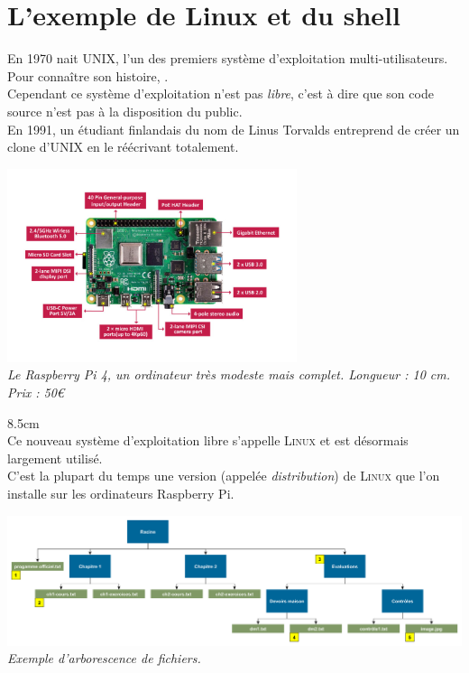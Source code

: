 \documentclass[a4paper,12pt,french]{book}
\begin{document}
	\section*{L'exemple de Linux et du shell}

	\double
	{
		En 1970 nait \textsc{UNIX}, l'un des premiers système d'exploitation multi-utilisateurs. Pour connaître son histoire,  .\\
		Cependant ce système d'exploitation n'est pas \textit{libre}, c'est à dire que son code source n'est pas à la disposition du public.\\
		En 1991, un étudiant finlandais du nom de Linus Torvalds entreprend de créer un clone d'\textsc{UNIX} en le réécrivant totalement.
	}
	{
		\begin{center}
			\includegraphics[width=8.5cm]{pi4.jpg}\\
			\footnotesize\textit{Le Raspberry Pi 4, un ordinateur très modeste mais complet. Longueur : 10 cm. Prix : 50€}
		\end{center}
	}{8.5cm}\ \\
	Ce nouveau système d'exploitation libre s'appelle \textsc{Linux} et est désormais largement utilisé.\\
	C'est la plupart du temps une version (appelée \textit{distribution}) de \textsc{Linux} que l'on installe sur les ordinateurs Raspberry Pi.
	
		\begin{center}
		\includegraphics[width=17cm]{hier.png}\\
		\footnotesize\textit{Exemple d'arborescence de fichiers.}
	\end{center}
\end{document}
